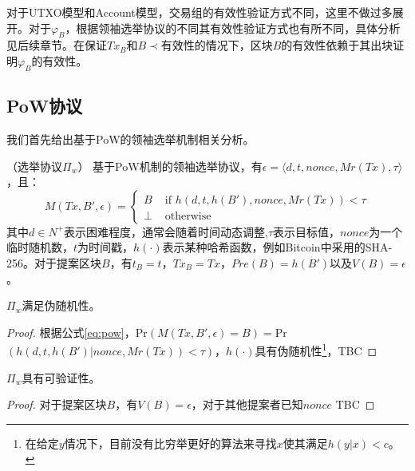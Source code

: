 对于UTXO模型和Account模型，交易组的有效性验证方式不同，这里不做过多展开。对于$\varphi_B$，根据领袖选举协议的不同其有效性验证方式也有所不同，具体分析见后续章节。在保证$Tx_B$和$B\prec$有效性的情况下，区块$B$的有效性依赖于其出块证明$\varphi_B$的有效性。



\subsection{PoW协议}
我们首先给出基于PoW的领袖选举机制相关分析。

\begin{definition}
（选举协议$\Pi_w$） 基于PoW机制的领袖选举协议，有$\epsilon=\langle d,t,nonce,Mr(Tx),\tau \rangle$，且：\\
\begin{equation}
\label{eq:pow}
M(Tx,B',\epsilon)=\begin{cases}
B & \text{ if } h(d,t,h(B'),nonce,Mr(Tx))<\tau \\ 
\bot & \text{ otherwise}
\end{cases}
\end{equation}
其中$d\in N^+$表示困难程度，通常会随着时间动态调整,$\tau$表示目标值，$nonce$为一个临时随机数，$t$为时间戳，$h(\cdot)$表示某种哈希函数，例如Bitcoin中采用的SHA-256。对于提案区块$B$，有$t_B=t$，$Tx_B=Tx$，$Pre(B)=h(B')$以及$V(B)=\epsilon$。
\end{definition}

\begin{corollary}
$\Pi_w$满足伪随机性。	
\end{corollary}

\begin{proof}
根据公式\ref{eq:pow}，Pr$(M(Tx,B',\epsilon)=B)=$Pr$(h(d,t,h(B')|nonce,Mr(Tx))<\tau)$，$h(\cdot)$具有伪随机性\footnote{在给定$y$情况下，目前没有比穷举更好的算法来寻找$x$使其满足$h(y|x)<c$。}，TBC%
\end{proof}

\begin{corollary}
$\Pi_w$具有可验证性。	
\end{corollary}

\begin{proof}
对于提案区块$B$，有$V(B)=\epsilon$，对于其他提案者已知$nonce$  TBC
\end{proof}



